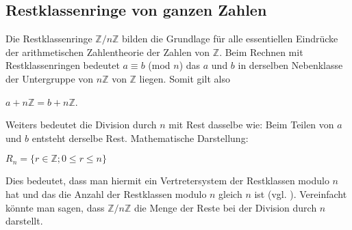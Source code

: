 \documentclass[12pt,a4paper]{article}
\theoremstyle{definition}
\begin{document}
\newpage
\subsection{Restklassenringe von ganzen Zahlen}\label{Restklassenringe von ganzen Zahlen}
Die Restklassenringe $\mathbb{Z}/n\mathbb{Z}$ bilden die Grundlage für alle essentiellen Eindrücke der arithmetischen Zahlentheorie der Zahlen von $\mathbb{Z}$.
Beim Rechnen mit Restklassenringen bedeutet $a \equiv b$ (mod $n$) das $a$ und $b$ in derselben Nebenklasse der Untergruppe von $n\mathbb{Z}$ von $\mathbb{Z}$ liegen.
Somit gilt also
\begin{center}
$a + n\mathbb{Z} = b + n\mathbb{Z}$.
\end{center}
Weiters bedeutet die Division durch $n$ mit Rest dasselbe wie: Beim Teilen von $a$ und $b$ entsteht derselbe Rest.
Mathematische Darstellung:
\begin{center}
$R_n = \{r \in \mathbb{Z}; 0 \leq r \le n\}$
\end{center}
Dies bedeutet, dass man hiermit ein Vertretersystem der Restklassen modulo $n$ hat und das die Anzahl der Restklassen modulo $n$ gleich $n$ ist (vgl. \cite[37--38]{Leutbecher2013}).
Vereinfacht könnte man sagen, dass $\mathbb{Z}/n\mathbb{Z}$ die Menge der Reste bei der Division durch $n$ darstellt.
\end{document}
